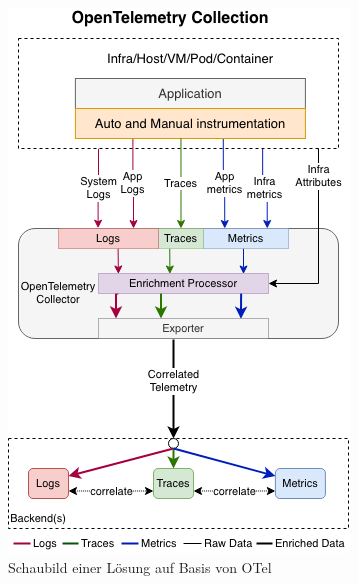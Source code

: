 \begin{figure}
\centering
\vspace{-3\baselineskip}
\includegraphics[width=\linewidth]{img/03_methoden/otel_unified-collection_2.png}
\caption{Schaubild einer Lösung auf Basis von OTel \cite{OpenTelemetryUnifiedCollection}}
\label{fig:otel-unified-collection}
\end{figure}

